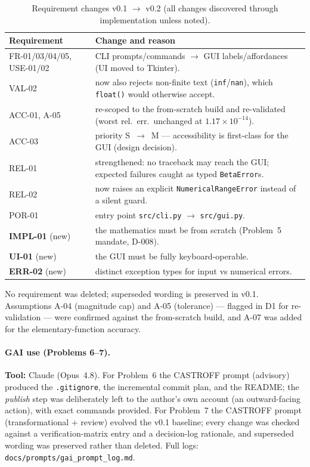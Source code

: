 \documentclass[11pt,a4paper]{article}
\begin{document}
\begin{table}[htbp]\centering\small
\caption{Requirement changes v0.1 $\rightarrow$ v0.2 (all changes discovered
through implementation unless noted).}
\label{tab:changes}
\begin{tabular}{@{}L{2.6cm} L{10.4cm}@{}}
\toprule
\textbf{Requirement} & \textbf{Change and reason}\\
\midrule
FR-01/03/04/05, USE-01/02 & CLI prompts/commands $\rightarrow$ GUI labels/affordances (UI moved to Tkinter).\\
VAL-02 & now also rejects non-finite text (\texttt{inf}/\texttt{nan}), which \texttt{float()} would otherwise accept.\\
ACC-01, A-05 & re-scoped to the from-scratch build and re-validated (worst rel.\ err.\ unchanged at $1.17\times10^{-14}$).\\
ACC-03 & priority S~$\rightarrow$~M --- accessibility is first-class for the GUI (design decision).\\
REL-01 & strengthened: no traceback may reach the GUI; expected failures caught as typed \texttt{BetaError}s.\\
REL-02 & now raises an explicit \texttt{NumericalRangeError} instead of a silent guard.\\
POR-01 & entry point \texttt{src/cli.py} $\rightarrow$ \texttt{src/gui.py}.\\
\textbf{IMPL-01} (new) & the mathematics must be from scratch (Problem~5 mandate, D-008).\\
\textbf{UI-01} (new) & the GUI must be fully keyboard-operable.\\
\textbf{ERR-02} (new) & distinct exception types for input vs numerical errors.\\
\bottomrule
\end{tabular}
\end{table}

\noindent No requirement was deleted; superseded wording is preserved in v0.1.
Assumptions A-04 (magnitude cap) and A-05 (tolerance) --- flagged in D1 for
re-validation --- were confirmed against the from-scratch build, and A-07 was
added for the elementary-function accuracy.

\paragraph{GAI use (Problems 6--7).} \textbf{Tool:} Claude (Opus~4.8).
For Problem~6 the CASTROFF prompt (advisory) produced the \texttt{.gitignore}, the
incremental commit plan, and the README; the \emph{publish} step was deliberately
left to the author's own account (an outward-facing action), with exact commands
provided. For Problem~7 the CASTROFF prompt (transformational + review) evolved
the v0.1 baseline; every change was checked against a verification-matrix entry
and a decision-log rationale, and superseded wording was preserved rather than
deleted. Full logs: \texttt{docs/prompts/gai\_prompt\_log.md}.
\end{document}
